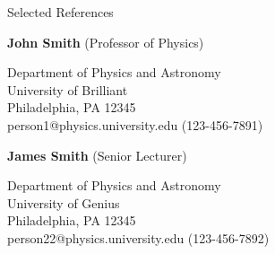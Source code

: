 \documentclass{resume} %
\begin{document}
\begin{rSection}{Selected References} \itemsep -3pt

\item \textbf{John Smith} (Professor of Physics)
\item Department of Physics and Astronomy\\
University of Brilliant\\
Philadelphia, PA 12345\\
person1@physics.university.edu (123-456-7891)


\item \textbf{James Smith} (Senior Lecturer)
\item Department of Physics and Astronomy\\
University of Genius\\
Philadelphia, PA 12345\\
person22@physics.university.edu (123-456-7892)
\end{rSection}
\end{document}
